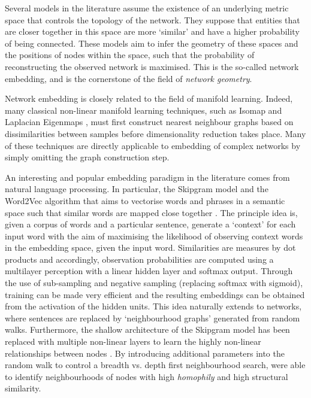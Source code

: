 \documentclass{report}
\begin{document}
	Several models in the literature assume the existence of an underlying metric space that controls the topology of the network. They suppose that entities that are closer together in this space are more `similar' and have a higher probability of being connected. These models aim to infer the geometry of these spaces and the positions of nodes within the space, such that the probability of reconstructing the observed network is maximised. This is the so-called network embedding, and is the cornerstone of the field of \textit{network geometry}. 

	Network embedding is closely related to the field of manifold learning. Indeed, many classical non-linear manifold learning techniques, such as Isomap \cite{tenenbaum2000global} and Laplacian Eigenmaps \cite{belkin2002laplacian}, must first construct nearest neighbour graphs based on dissimilarities between samples before dimensionality reduction takes place. Many of these techniques are directly applicable to embedding of complex networks by simply omitting the graph construction step.

	An interesting and popular embedding paradigm in the literature comes from natural language processing. In particular, the Skipgram model and the Word2Vec algorithm that aims to vectorise words and phrases in a semantic space such that similar words are mapped close together \cite{mikolov2013distributed,mikolov2013efficient}. The principle idea is, given a corpus of words and a particular sentence, generate a `context' for each input word with the aim of maximising the likelihood of observing context words in the embedding space, given the input word. Similarities are measures by dot products and accordingly, observation probabilities are computed using a multilayer perception with a linear hidden layer and softmax output. Through the use of sub-sampling and negative sampling (replacing softmax with sigmoid), training can be made very efficient and the resulting embeddings can be obtained from the activation of the hidden units. This idea naturally extends to networks, where sentences are replaced by `neighbourhood graphs' generated from random walks. Furthermore, the shallow architecture of the Skipgram model has been replaced with multiple non-linear layers to learn the highly non-linear relationships between nodes \cite{tang2015line,perozzi2014deepwalk}. By introducing additional parameters into the random walk to control a breadth vs. depth first neighbourhood search, \cite{grover2016node2vec} were able to identify neighbourhoods of nodes with high \textit{homophily} and high structural similarity. 
	
\end{document}
